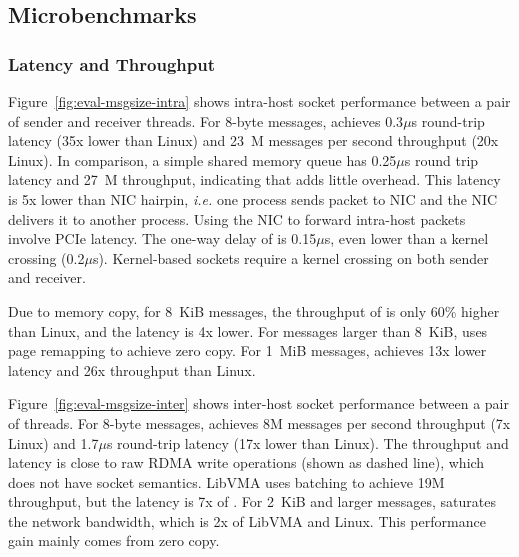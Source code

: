 \subsection{Microbenchmarks}
\label{subsec:microbenchmark}

\subsubsection{Latency and Throughput}
\quad



Figure~\ref{fig:eval-msgsize-intra} shows intra-host socket performance between a pair of sender and receiver threads.
For 8-byte messages, \sys achieves 0.3$\mu$s round-trip latency (35x lower than Linux) and 23~M messages per second throughput (20x Linux).
In comparison, a simple shared memory queue has 0.25$\mu$s round trip latency and 27~M throughput, indicating that \sys adds little overhead.
This latency is 5x lower than NIC hairpin, \textit{i.e.} one process sends packet to NIC and the NIC delivers it to another process. Using the NIC to forward intra-host packets involve PCIe latency.
The one-way delay of \sys is 0.15$\mu$s, even lower than a kernel crossing (0.2$\mu$s). Kernel-based sockets require a kernel crossing on both sender and receiver.

Due to memory copy, for 8~KiB messages, the throughput of \sys is only 60\% higher than Linux, and the latency is 4x lower. For messages larger than 8~KiB, \sys uses page remapping to achieve zero copy. For 1~MiB messages, \sys achieves 13x lower latency and 26x throughput than Linux.


Figure~\ref{fig:eval-msgsize-inter} shows inter-host socket performance between a pair of threads.
For 8-byte messages, \sys achieves 8M messages per second throughput (7x Linux) and 1.7$\mu$s round-trip latency (17x lower than Linux).
The throughput and latency is close to raw RDMA write operations (shown as dashed line), which does not have socket semantics.
LibVMA uses batching to achieve 19M throughput, but the latency is 7x of \sys.
For 2~KiB and larger messages, \sys saturates the network bandwidth, which is 2x of LibVMA and Linux. This performance gain mainly comes from zero copy.



